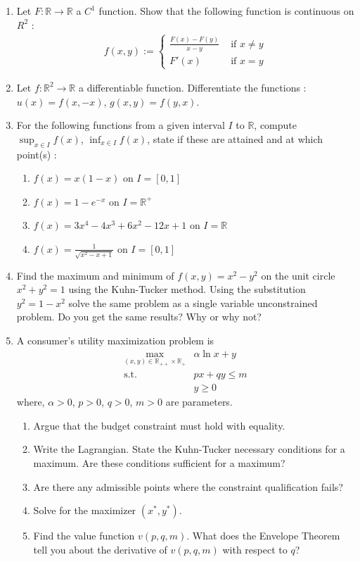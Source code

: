 \documentclass[11pt,letterpaper]{scrartcl}
\newcommand{\reals}{\mathbb{R}}
\begin{document}
\begin{enumerate}
	\item Let $F: \reals \rightarrow \reals$ a $C^1$ function. Show that the following function is continuous on $R^2$ :
	\begin{align*}
	f(x,y):= \begin{cases}
	\frac{F(x)-F(y)}{x-y} & \text{ if } x \neq y
	\\
	F'(x) & \text{ if } x = y
	\end{cases}
	\end{align*}

	\item Let $f: \reals^2 \rightarrow \reals$ a differentiable function. Differentiate the functions : $u(x)=f(x,-x)$, $g(x,y)=f(y,x)$.

	\item For the following functions from a given interval $I$ to $\reals$, compute $\sup_{x \in I} f(x)$, $\inf_{x \in I} f(x)$, state if these are attained and at which point(s) :
	\begin{enumerate}
		\item $f(x)=x(1-x)$ on $I=[0,1]$
		\item $f(x)=1-e^{-x}$ on $I = \reals^+$
		\item $f(x)=3x^4 - 4x^3 + 6x^2 - 12x + 1$ on $I= \reals$
		\item $f(x)= \frac{1}{\sqrt{x^2-x+1}}$ on $I = [0,1]$
	\end{enumerate}
	


	\item Find the maximum and minimum of $f\left(x,y\right)=x^{2}-y^{2}$ on the unit circle $x^{2}+y^{2}=1$ using the Kuhn-Tucker method. Using the substitution $y^{2}=1-x^{2}$ solve the same problem as a single variable unconstrained problem. Do you get the same results? Why or why not?

	\item A consumer's utility maximization problem is
	\begin{align*}
	\max_{\left(x,y\right)\in\mathbb{R}_{++}\times\mathbb{R}_{+}} & \alpha\ln x+y\\
	\text{s.t.\ } & px+qy\leq m\\
	 & y\geq0
	\end{align*}
	where, $\alpha>0$, $p>0$, $q>0$, $m>0$ are parameters.
	\begin{enumerate}
	\item Argue that the budget constraint must hold with equality.
	\item Write the Lagrangian. State the Kuhn-Tucker necessary conditions for
	a maximum. Are these conditions sufficient for a maximum?
	\item Are there any admissible points where the constraint qualification
	fails?
	\item Solve for the maximizer $\left(x^{*},y^{*}\right)$.
	\item Find the value function $v\left(p,q,m\right)$. What does the Envelope
	Theorem tell you about the derivative of $v\left(p,q,m\right)$ with
	respect to $q$?
	\end{enumerate}


\end{enumerate}
\end{document}
